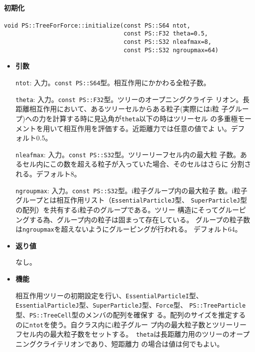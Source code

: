 \paragraph{初期化}
\mbox{}

\begin{screen}
\begin{verbatim}
void PS::TreeForForce::initialize(const PS::S64 ntot,
                                  const PS::F32 theta=0.5,
                                  const PS::S32 nleafmax=8,
                                  const PS::S32 ngroupmax=64)
\end{verbatim}
\end{screen}

\begin{itemize}

\item{{\bf 引数}}

{\tt ntot}: 入力。{\tt const PS::S64}型。相互作用にかかわる全粒子数。

{\tt theta}: 入力。{\tt const PS::F32}型。ツリーのオープニングクライテ
リオン。長距離相互作用において、あるツリーセルからある粒子(実際にはi粒
子グループ)への力を計算する時に見込角が{\tt theta}以下の時はツリーセル
の多重極モーメントを用いて相互作用を評価する。近距離力では任意の値でよ
い。デフォルト0.5。

{\tt nleafmax}: 入力。{\tt const PS::S32}型。ツリーリーフセル内の最大粒
子数。あるセル内にこの数を超える粒子が入っていた場合、そのセルはさらに
分割される。デフォルト8。

{\tt ngroupmax}: 入力。{\tt const PS::S32}型。i粒子グループ内の最大粒子
数。i粒子グループとは相互作用リスト（\verb|EssentialParticleJ|型、
\verb|SuperParticleJ|型の配列）を共有するi粒子のグループである。ツリー
構造にそってグルーピングする為、グループ内の粒子は固まって存在している。
グループの粒子数は{\tt ngroupmax}を超えないようにグルーピングが行われる。
デフォルト64。

\item{{\bf 返り値}}

なし。

\item{{\bf 機能}}

相互作用ツリーの初期設定を行い、\verb|EssentialParticleI|型、
\verb|EssentialParticleJ|型、\verb|SuperParticleJ|型、\verb|Force|型、
\verb|PS::TreeParticle|型、\verb|PS::TreeCell|型のメンバの配列を確保す
る。配列のサイズを推定するのに{\tt ntot}を使う。自クラス内にi粒子グルー
プ内の最大粒子数とツリーリーフセル内の最大粒子数をセットする。{\tt
theta}は長距離力用のツリーのオープニングクライテリオンであり、短距離力
の場合は値は何でもよい。

\end{itemize}


